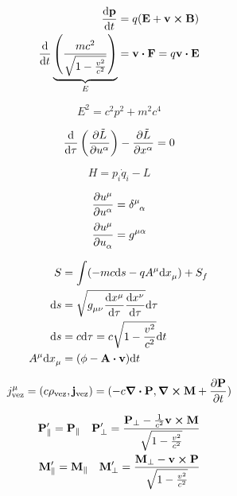 \documentclass[11pt,twoside]{article}
\begin{document}
\begin{multicols}{3}
\begin{equation}
\begin{split}
\dv{\vb{p}}{t}&=q(\vb{E}+\vb{v}\cross\vb{B})\\
\dv{t}\underbrace{\left(\frac{mc^2}{\sqrt{1-\frac{v^2}{c^2}}} \right)}_{E} &= \vb{v}\vdot\vb{F} = q\vb{v}\vdot\vb{E}
\end{split}
\end{equation}

\begin{equation}
E^2 = c^2p^2+m^2c^4
\end{equation}

\begin{equation}
\dv{\tau}\left(\pdv{\tilde{L}}{u\indices{^\alpha}} \right) - \pdv{\tilde{L}}{x\indices{^\alpha}} = 0
\end{equation}

\begin{equation}
H=p_i\dot{q}_i-L
\end{equation}

\begin{equation}
\begin{split}
\pdv{u\indices{^\mu}}{u\indices{^\alpha}}&=\delta\indices{^\mu_\alpha} \\
\pdv{u\indices{^\mu}}{u\indices{_\alpha}}&=g\indices{^{\mu\alpha}}
\end{split}
\end{equation}

\begin{equation}
\begin{split}
S &= \int (-mc\dd s - qA\indices{^\mu}\dd x\indices{_\mu}) + S\indices{_f} \\
\dd s &= \sqrt{g\indices{_{\mu\nu}}\dv{x\indices{^\mu}}{\tau}\dv{x\indices{^\nu}}{\tau}} \dd \tau \\
\dd s &= c \dd \tau = c \sqrt{1-\frac{v^2}{c^2}}\dd t \\
A\indices{^\mu}\dd x\indices{_\mu} &= (\phi - \vb{A}\vdot\vb{v})\dd t
\end{split}
\end{equation}

\begin{equation}
j_{\text{vez}}^\mu = (c\rho_{\text{vez}},\vb{j}_{\text{vez}}) = (-c\div{\vb{P}},\curl{\vb{M}}+\pdv{\vb{P}}{t})
\end{equation}

\begin{equation}
\begin{split}
\vb{P}'_\parallel = \vb{P}_\parallel \quad \vb{P}'_\perp = \frac{\vb{P}_\perp - \frac{1}{c^2}\vb{v}\cross\vb{M}}{\sqrt{1-\frac{v^2}{c^2}}} \\
\vb{M}'_\parallel = \vb{M}_\parallel \quad \vb{M}'_\perp = \frac{\vb{M}_\perp - \vb{v}\cross\vb{P}}{\sqrt{1-\frac{v^2}{c^2}}}
\end{split}
\end{equation}


\end{multicols}
\end{document}
